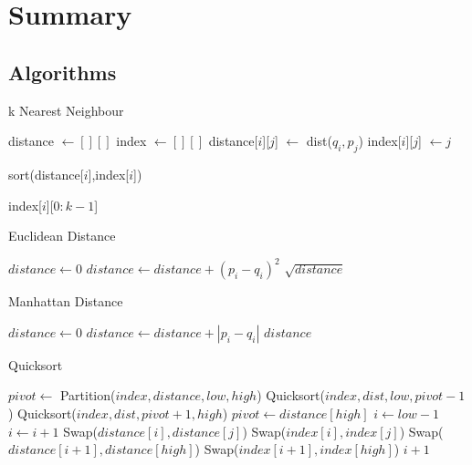 \documentclass[10pt]{article}
\begin{document}
\section{Summary}


\begin{appendices}
\section{Algorithms}\label{app:Algorithms}
\begin{algorithm}[H]
\caption{k Nearest Neighbour}\label{alg:kNN}
\begin{algorithmic}[1]
	\State distance $\gets [][]$
	\State index $\gets [][]$
			\State distance[$i$][$j$] $\gets$ dist($q_{i},p_{j}$)
			\State index[$i$][$j$] $\gets j$
		\EndFor
	\EndFor
	
		\State sort(distance[$i$],index[$i$])
	\EndFor
	
	\State \RETURN index[$i$][$0:k-1$]
\EndProcedure
\end{algorithmic}
\end{algorithm}
\end{appendices}
\begin{algorithm}[H]
\caption{Euclidean Distance}\label{alg:euclid}
\begin{algorithmic}[1]
	\State $distance \gets 0$
		\State $distance \gets distance + (p_{i} - q_{i})^2$
	\EndFor
	\State \RETURN $\sqrt{distance}$
\EndProcedure
\end{algorithmic}
\end{algorithm}
\begin{algorithm}[H]
\caption{Manhattan Distance}\label{alg:manhattan}
\begin{algorithmic}[1]
	\State $distance \gets 0$
		\State $distance \gets distance + |p_{i} - q_{i}|$
	\EndFor
	\State \RETURN $distance$
\EndProcedure
\end{algorithmic}
\end{algorithm}
\begin{algorithm}[H]
\caption{Quicksort}\label{alg:qsort}
\begin{algorithmic}[1]
		\State $pivot \gets$ Partition($index,distance,low,high$)
		\State Quicksort($index,dist,low,pivot-1$)
		\State Quicksort($index,dist,pivot+1,high$)
	\EndIf
\EndProcedure
{}
	\State $pivot \gets distance[high]$
	\State $i \gets low - 1$
			\State $i \gets i + 1$
			\State Swap($distance[i],distance[j]$)
			\State Swap($index[i],index[j]$)
		\EndIf
	\EndFor
	\State Swap($distance[i+1],distance[high]$)
	\State Swap($index[i+1],index[high]$)
	\State \RETURN $i+1$
\EndProcedure
\end{algorithmic}
\end{algorithm}
\end{document}
